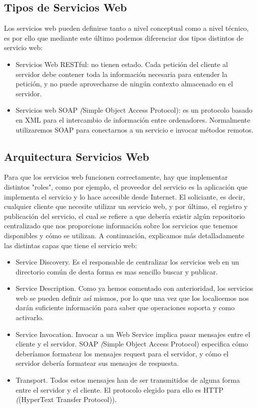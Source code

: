 \subsection{Tipos de Servicios Web}
\label{cap:subsec:serviciosweb}

Los servicios web pueden definirse tanto a nivel conceptual como a nivel técnico, es por ello que mediante este último podemos diferenciar dos tipos distintos de servicio web:
\begin{itemize}
	\item Servicios Web RESTful: no tienen estado. Cada petición del cliente al servidor debe contener toda la información necesaria para entender la petición, y no puede aprovecharse de ningún contexto almacenado en el servidor.
	\item Servicios web SOAP  \textit({Simple Object Access Protocol}): es un protocolo basado en XML para el intercambio de información entre ordenadores. Normalmente utilizaremos SOAP para conectarnos a un servicio e invocar métodos remotos.
\end{itemize}

\subsection{Arquitectura Servicios Web}
\label{cap:subsec:serviciosweb}
Para que los servicios web funcionen correctamente, hay que implementar distintos "roles", como por ejemplo, el proveedor del servicio es
la aplicación que implementa el servicio y lo hace accesible desde Internet. El soliciante, es decir, cualquier cliente que necesite
utilizar un servicio web, y por último, el registro y publicación del servicio, el cual se refiere a que debería existir algún
repositorio centralizado que nos proporcione información sobre los servicios que tenemos disponibles y cómo se utilizan. A continuación,
explicamos más detalladamente las distintas capas que tiene el servicio web:
\begin{itemize}
 \item Service Discovery. Es el responsable de centralizar los servicios web en un directorio común de desta forma es mas sencillo buscar y publicar.
 \item Service Description. Como ya hemos comentado con anterioridad, los servicios web se pueden definir así mismos, por lo que una vez que los localicemos nos darán suficiente información para saber que operaciones soporta y como activarlo.
 \item Service Invocation. Invocar a un Web Service implica pasar mensajes entre el cliente y el servidor. SOAP  \textit({Simple Object Access Protocol}) especifica cómo deberíamos formatear los mensajes request para el servidor, y cómo el servidor debería formatear sus mensajes de respuesta.
 \item Transport. Todos estos mensajes han de ser transmitidos de alguna forma entre el servidor y el cliente. El protocolo elegido para ello es HTTP  \textit({(HyperText Transfer Protocol)}). 
\end{itemize}

